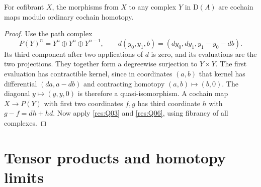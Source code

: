 \begin{corollary}\label{res:Q14}
For cofibrant \(X\), the morphisms from \(X\) to any
complex \(Y\) in \(\mathrm D(A)\) are cochain maps modulo
ordinary cochain homotopy.
\end{corollary}
\begin{proof}
Use the path complex
\[
 P(Y)^n=Y^n\oplus Y^n\oplus Y^{n-1},\qquad
 d(y_0,y_1,b)=(dy_0,dy_1,y_1-y_0-db).
\]
Its third component after two applications of \(d\) is
zero, and its evaluations are the two projections. They
together form a degreewise surjection to \(Y\times Y\).
The first evaluation has contractible kernel, since in
coordinates \((a,b)\) that kernel has differential
\((da,a-db)\) and contracting homotopy \((a,b)\mapsto(b,0)\).
The diagonal \(y\mapsto(y,y,0)\) is therefore a
quasi-isomorphism. A cochain map \(X\to P(Y)\) with
first two coordinates \(f,g\) has third coordinate
\(h\) with \(g-f=d h+h d\). Now apply \ref{res:Q03}
and \ref{res:Q06}, using fibrancy of all complexes.
\end{proof}

\section{Tensor products and homotopy limits}

